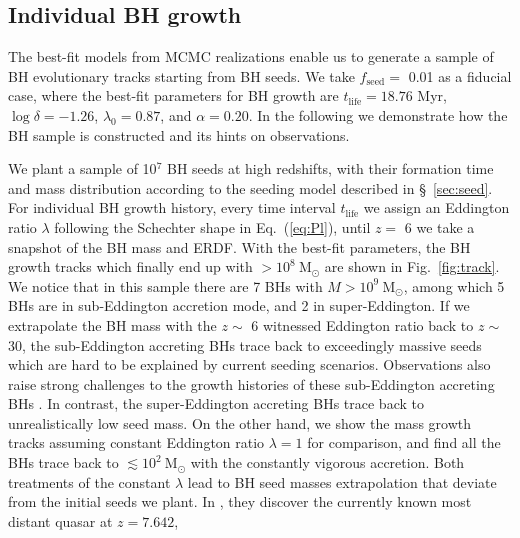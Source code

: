 \documentclass[twocolumn, twocolappendix]{aastex63}
\newcommand{\Msun}{\mathrm{M_\odot}}
\newcommand{\tlife}{t_\mathrm{life}}
\newcommand{\fseed}{f_\mathrm{seed}}
\newcommand{\blue}[1]{\textcolor{blue}{ #1}}
\begin{document}
\begin{CJK*}{UTF8}{gbsn}
\vspace{2mm}
\subsection{Individual BH growth}\label{sec:evol}
The best-fit models from MCMC realizations enable us to generate a sample of BH evolutionary tracks starting from BH seeds.
We take $\fseed=$ 0.01 as a fiducial case, where the best-fit parameters for BH growth are 
$\tlife=18.76$ Myr, $\log\delta=-1.26$, $\lambda_0=0.87$, and $\alpha=0.20$.
In the following we demonstrate how the BH sample is constructed and its hints on observations.

We plant a sample of 10$^7$ BH seeds at high redshifts, 
with their formation time and mass distribution according to the seeding model described in \S~\ref{sec:seed}. 
For individual BH growth history, every time interval $\tlife$ we assign an Eddington ratio 
$\lambda$ following the Schechter shape in Eq.~(\ref{eq:Pl}), 
until $z=$ 6 we take a snapshot of the BH mass and ERDF.
With the best-fit parameters, the BH growth tracks which finally end up with $>10^8~\Msun$ 
are shown in Fig.~\ref{fig:track}. 
We notice that in this sample there are 7 BHs with $M>10^9~\Msun$, 
among which 5 BHs are in sub-Eddington accretion mode, and 2 in super-Eddington. 
If we extrapolate the BH mass with the $z \sim$ 6 witnessed Eddington ratio back to $z\sim$ 30, 
the sub-Eddington accreting BHs trace back to exceedingly massive seeds which are hard to be explained by current seeding scenarios. 
Observations also raise strong challenges to the growth histories of these sub-Eddington accreting BHs
\citep[e.g.,][]{2019ApJ...880...77O}.
In contrast, the super-Eddington accreting BHs trace back to unrealistically low seed mass. 
On the other hand, we show the mass growth tracks assuming constant Eddington ratio $\lambda=1$ for comparison, 
and find all the BHs trace back to $\lesssim 10^2~\Msun$ with the constantly vigorous accretion. 
Both treatments of the constant $\lambda$ lead to BH seed masses extrapolation that deviate from the initial seeds we plant. 
In \citet{2021ApJ...907L...1W}, they discover the currently known most distant quasar at $z=7.642$, 

\end{CJK*}
\end{document}
